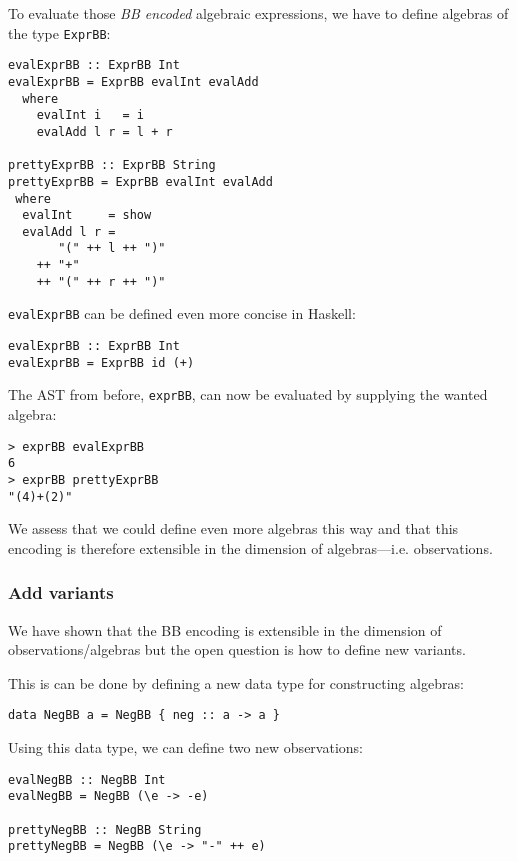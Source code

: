 To evaluate those \emph{BB encoded} algebraic expressions, we have to define
algebras of the type \texttt{ExprBB}:

\begin{lstlisting}
evalExprBB :: ExprBB Int
evalExprBB = ExprBB evalInt evalAdd
  where
    evalInt i   = i
    evalAdd l r = l + r

prettyExprBB :: ExprBB String
prettyExprBB = ExprBB evalInt evalAdd
 where
  evalInt     = show
  evalAdd l r =
       "(" ++ l ++ ")"
    ++ "+"
    ++ "(" ++ r ++ ")"
\end{lstlisting}

\texttt{evalExprBB} can be defined even more concise in Haskell:

\begin{lstlisting}
evalExprBB :: ExprBB Int
evalExprBB = ExprBB id (+)
\end{lstlisting}

The AST from before, \texttt{exprBB}, can now be evaluated by supplying the
wanted algebra:

\begin{lstlisting}
> exprBB evalExprBB
6
> exprBB prettyExprBB
"(4)+(2)"
\end{lstlisting}

We assess that we could define even more algebras this way and that this
encoding is therefore extensible in the dimension of algebras—i.e. observations.

\subsubsection{Add variants}

We have shown that the BB encoding is extensible in the dimension of
observations/algebras but the open question is how to define new variants.

This is can be done by defining a new data type for constructing algebras:

\begin{lstlisting}
data NegBB a = NegBB { neg :: a -> a }
\end{lstlisting}

Using this data type, we can define two new observations:

\begin{lstlisting}
evalNegBB :: NegBB Int
evalNegBB = NegBB (\e -> -e)

prettyNegBB :: NegBB String
prettyNegBB = NegBB (\e -> "-" ++ e)
\end{lstlisting}

